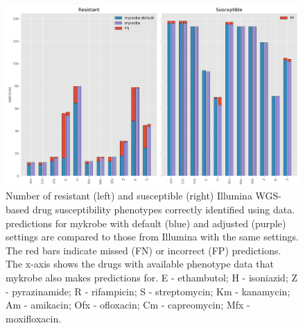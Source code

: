 \begin{figure}
\begin{center}
\includegraphics[width=0.90\columnwidth]{Appendix2/Figs/mykrobe_settings_illumina_concordance.png}
\caption{{Number of resistant (left) and susceptible (right) Illumina WGS-based drug susceptibility phenotypes correctly identified using \ont{} data. \ont{} predictions for mykrobe with default (blue) and adjusted (purple) settings are compared to those from Illumina with the same settings. The red bars indicate missed (FN) or incorrect (FP) predictions. The x-axis shows the drugs with available phenotype data that mykrobe also makes predictions for. E - ethambutol; H - isoniazid; Z - pyrazinamide; R - rifampicin; S - streptomycin; Km - kanamycin; Am - amikacin; Ofx - ofloxacin; Cm - capreomycin; Mfx - moxifloxacin.
{\label{fig:mykrobe-settings-geno}}
}}
\end{center}
\end{figure}


